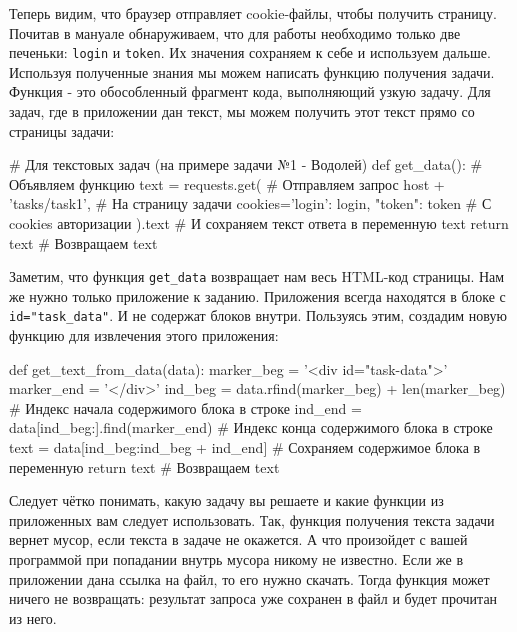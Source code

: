 \documentclass[12pt]{article}
\begin{document}
	Теперь видим, что браузер отправляет cookie-файлы, чтобы получить страницу. Почитав в мануале обнаруживаем, что для работы необходимо только две печеньки: \verb|login| и \verb|token|. Их значения сохраняем к себе и используем дальше.
	\linebreak
	Используя полученные знания мы можем написать функцию получения задачи. Функция - это обособленный фрагмент кода, выполняющий узкую задачу.
	\linebreak
	Для задач, где в приложении дан текст, мы можем получить этот текст прямо со страницы задачи:

	\begin{pythoncode}
# Для текстовых задач (на примере задачи №1 - Водолей)
def get_data():                                   # Объявляем функцию
    text = requests.get(                          # Отправляем запрос
        host + 'tasks/task1',                     # На страницу задачи
        cookies={'login': login, "token": token}  # С cookies авторизации
    ).text                                        # И сохраняем текст ответа в переменную text
    return text                                   # Возвращаем text
	\end{pythoncode}

	Заметим, что функция \verb|get_data| возвращает нам весь HTML-код страницы. Нам же нужно только приложение к заданию. Приложения всегда находятся в блоке с \verb|id="task_data"|. И не содержат блоков внутри. Пользуясь этим, создадим новую функцию для извлечения этого приложения:

\begin{pythoncode}
def get_text_from_data(data):
    marker_beg = '<div id="task-data">'     
    marker_end = '</div>'
    ind_beg = data.rfind(marker_beg) + len(marker_beg)  # Индекс начала содержимого блока в строке
    ind_end = data[ind_beg:].find(marker_end)           # Индекс конца содержимого блока в строке
    text = data[ind_beg:ind_beg + ind_end]              # Сохраняем содержимое блока в переменную
    return text                                         # Возвращаем text
	\end{pythoncode}

	Следует чётко понимать, какую задачу вы решаете и какие функции из приложенных вам следует использовать. Так, функция получения текста задачи вернет мусор, если текста в задаче не окажется. А что произойдет с вашей программой при попадании внутрь мусора никому не известно.
	\linebreak
	\linebreak
	Если же в приложении дана ссылка на файл, то его нужно скачать. Тогда функция может ничего не возвращать: результат запроса уже сохранен в файл и будет прочитан из него.
\end{document}
